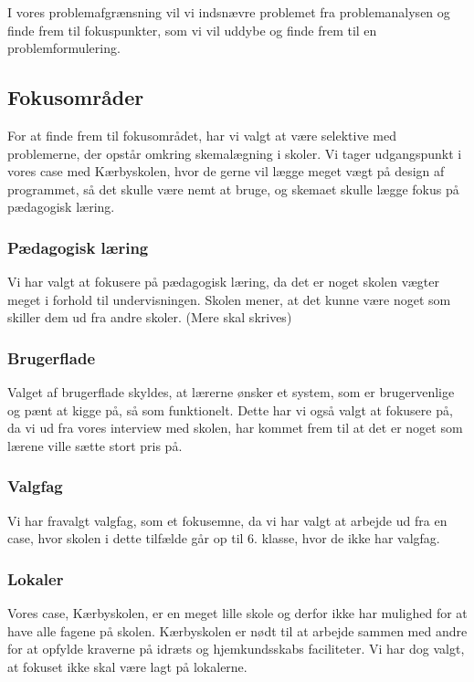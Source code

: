 
I vores problemafgrænsning vil vi indsnævre problemet fra problemanalysen og finde frem til fokuspunkter, som vi vil uddybe og finde frem til en problemformulering.

\subsection{Fokusområder}
For at finde frem til fokusområdet, har vi valgt at være selektive med problemerne, der opstår omkring skemalægning i skoler. Vi tager udgangspunkt i vores case med Kærbyskolen, hvor de gerne vil lægge meget vægt på design af programmet, så det skulle være nemt at bruge, og skemaet skulle lægge fokus på pædagogisk læring.

\subsubsection{Pædagogisk læring}
Vi har valgt at fokusere på pædagogisk læring, da det er noget skolen vægter meget i forhold til undervisningen. Skolen mener, at det kunne være noget som skiller dem ud fra andre skoler.
(Mere skal skrives)

\subsubsection{Brugerflade}
Valget af brugerflade skyldes, at lærerne ønsker et system, som er brugervenlige og pænt at kigge på, så som funktionelt. Dette har vi også valgt at fokusere på, da vi ud fra vores interview med skolen, har kommet frem til at det er noget som lærene ville sætte stort pris på.

\subsubsection{Valgfag}
Vi har fravalgt valgfag, som et fokusemne, da vi har valgt at arbejde ud fra en case, hvor skolen i dette tilfælde går op til 6. klasse, hvor de ikke har valgfag.

\subsubsection{Lokaler}
Vores case, Kærbyskolen, er en meget lille skole og derfor ikke har mulighed for at have alle fagene på skolen. Kærbyskolen er nødt til at arbejde sammen med andre for at opfylde kraverne på idræts og hjemkundsskabs faciliteter. Vi har dog valgt, at fokuset ikke skal være lagt på lokalerne.

